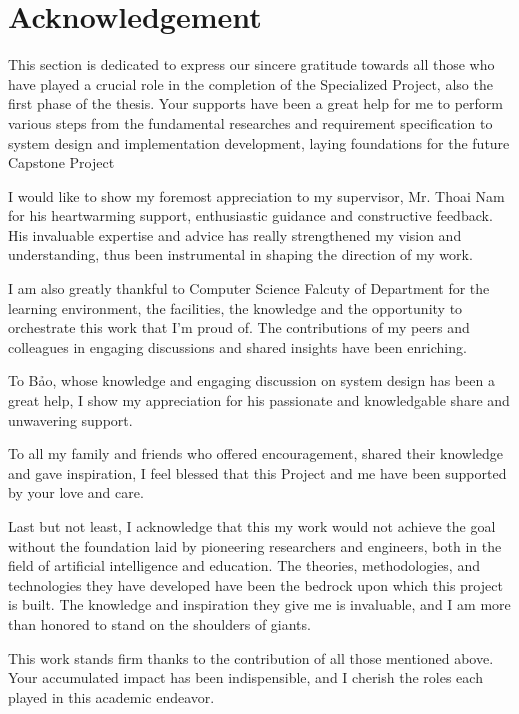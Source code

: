 \section*{Acknowledgement}
\thispagestyle{empty}
This section is dedicated to express our sincere gratitude towards all those who have played a crucial role in the
completion of the Specialized Project, also the first phase of the thesis. Your supports have been a great help for
me to perform various steps from the fundamental researches and requirement specification to system design and implementation
development, laying foundations for the future Capstone Project

I would like to show my foremost appreciation to my supervisor, Mr. Thoai Nam for his heartwarming support, enthusiastic guidance and constructive feedback. 
His invaluable expertise and advice has really strengthened my vision and understanding, thus been instrumental in shaping the direction of my work.

I am also greatly thankful to Computer Science Falcuty of Department for the learning environment, the facilities, the knowledge and the opportunity to orchestrate this work that I'm proud of. The contributions of my peers and colleagues in engaging discussions and shared insights have been enriching. 

To Bảo, whose knowledge and engaging discussion on system design has been a great help, I show my appreciation for his passionate and knowledgable share and unwavering support.

To all my family and friends who offered encouragement, shared their knowledge and gave inspiration, 
 I feel blessed that this Project and me have been supported by your love and care. 

Last but not least, I acknowledge that this my work would not achieve the goal without the foundation laid by pioneering researchers and engineers, both in the field of 
artificial intelligence and education. The theories, methodologies, and technologies they have developed have been the bedrock upon which this project is built. 
The knowledge and inspiration they give me is invaluable, and I am more than honored to stand on the shoulders of giants.

This work stands firm thanks to the contribution of all those mentioned above. Your accumulated impact has been indispensible, and I cherish the roles each played in this academic endeavor. 
\clearpage
{}
